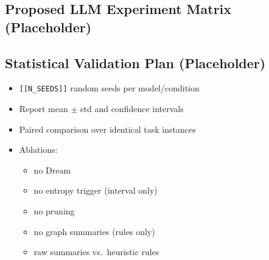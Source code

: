 \documentclass{article}
\begin{document}
\subsection{Proposed LLM Experiment Matrix (Placeholder)}


\subsection{Statistical Validation Plan (Placeholder)}

\begin{itemize}[leftmargin=1.25em]
\item \texttt{[[N\_SEEDS]]} random seeds per model/condition
\item Report mean $\pm$ std and confidence intervals
\item Paired comparison over identical task instances
\item Ablations:
  \begin{itemize}[leftmargin=1.25em]
  \item no Dream
  \item no entropy trigger (interval only)
  \item no pruning
  \item no graph summaries (rules only)
  \item raw summaries vs.\ heuristic rules
  \end{itemize}
\end{itemize}
\end{document}
